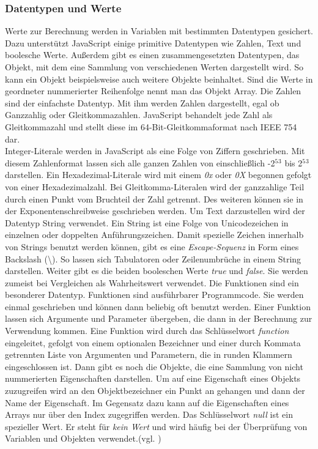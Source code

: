 \subsubsection{Datentypen und Werte} Werte zur Berechnung werden in Variablen mit bestimmten Datentypen gesichert. Dazu unterstützt JavaScript einige primitive Datentypen wie Zahlen, Text und boolesche Werte. Außerdem gibt es einen zusammengesetzten Datentypen, das Objekt, mit dem eine Sammlung von verschiedenen Werten dargestellt wird. So kann ein Objekt beispielsweise auch weitere Objekte beinhaltet. Sind die Werte in geordneter nummerierter Reihenfolge nennt man das Objekt Array. Die Zahlen sind der einfachste Datentyp. Mit ihm werden Zahlen dargestellt, egal ob Ganzzahlig oder Gleitkommazahlen. JavaScript behandelt jede Zahl als Gleitkommazahl und stellt diese im 64-Bit-Gleitkommaformat nach IEEE 754 dar.\\Integer-Literale werden in JavaScript als eine Folge von Ziffern geschrieben. Mit diesem Zahlenformat lassen sich alle ganzen Zahlen von einschließlich -2$^5$$^3$ bis 2$^5$$^3$ darstellen. Ein Hexadezimal-Literale wird mit einem \textit{0x} oder \textit{0X} begonnen gefolgt von einer Hexadezimalzahl. Bei Gleitkomma-Literalen wird der ganzzahlige Teil durch einen Punkt vom Bruchteil der Zahl getrennt. Des weiteren können sie in der Exponentenschreibweise geschrieben werden. Um Text darzustellen wird der Datentyp String verwendet. Ein String ist eine Folge von Unicodezeichen in einzelnen oder doppelten Anführungszeichen. Damit spezielle Zeichen innerhalb von Strings benutzt werden können, gibt es eine \textit{Escape-Sequenz} in Form eines Backslash (\textbackslash). So lassen sich Tabulatoren oder Zeilenumbrüche in einem String darstellen. Weiter gibt es die beiden booleschen Werte \textit{true} und \textit{false}. Sie werden zumeist bei Vergleichen als Wahrheitswert verwendet. Die Funktionen sind ein besonderer Datentyp. Funktionen sind ausführbarer Programmcode. Sie werden einmal geschrieben und können dann beliebig oft benutzt werden. Einer Funktion lassen sich Argumente und Parameter übergeben, die dann in der Berechnung zur Verwendung kommen. Eine Funktion wird durch das Schlüsselwort \textit{function} eingeleitet, gefolgt von einem optionalen Bezeichner und einer durch Kommata getrennten Liste von Argumenten und Parametern, die in runden Klammern eingeschlossen ist. Dann gibt es noch die Objekte, die eine Sammlung von nicht nummerierten Eigenschaften darstellen. Um auf eine Eigenschaft eines Objekts zuzugreifen wird an den Objektbezeichner ein Punkt an gehangen und dann der Name der Eigenschaft. Im Gegensatz dazu kann auf die Eigenschaften eines Arrays nur über den Index zugegriffen werden. Das Schlüsselwort \textit{null} ist ein spezieller Wert. Er steht für \textit{kein Wert} und wird häufig bei der Überprüfung von Variablen und Objekten verwendet.(vgl. \cite[S.22ff]{FlanJava2007})
	
